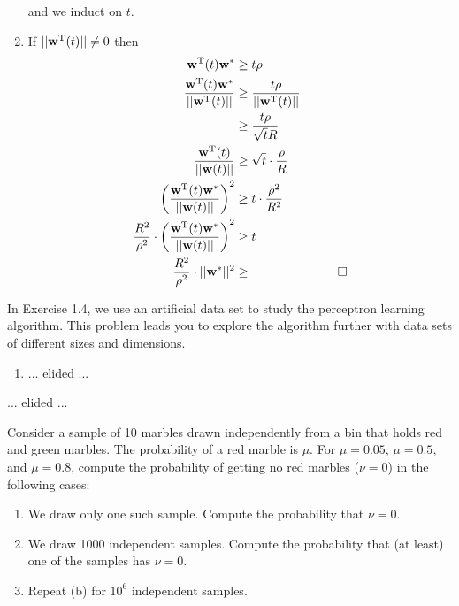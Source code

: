 \documentclass{amsart}
\begin{document}
\begin{solution}
\begin{enumerate}
      and we induct on \(t\).
    \item If \(||{\bf w}^\textup{T}(t)|| \neq 0\) then
      \begin{align*}
        {\bf w}^\textup{T}(t){\bf w}^* &\geq t\rho & & \\
        \frac{{\bf w}^\textup{T}(t){\bf w}^*}{||{\bf w}^\textup{T}(t)||} &\geq
          \frac{t\rho}{||{\bf w}^\textup{T}(t)||} & & \\
        &\geq \frac{t\rho}{\sqrt{t}R} & & \\
        \frac{{\bf w}^\textup{T}(t)}{||{\bf w}(t)||} &\geq
          \sqrt{t} \cdot \frac{\rho}{R} & & \\
        \left(\frac{{\bf w}^\textup{T}(t){\bf w}^*}{||{\bf w}(t)||}\right)^2
          &\geq t \cdot \frac{\rho^2}{R^2} & & \\
        \frac{R^2}{\rho^2} \cdot
          \left(\frac{{\bf w}^\textup{T}(t){\bf w}^*}
          {||{\bf w}(t)||}\right)^2 &\geq t & & \\
        \frac{R^2}{\rho^2} \cdot ||{\bf w}^*||^2 &\geq & &\qed
      \end{align*}
  \end{enumerate}
\end{solution}

\begin{problem}[1.4]
  In Exercise 1.4, we use an artificial data set to study the perceptron
  learning algorithm. This problem leads you to explore the algorithm further
  with data sets of different sizes and dimensions.
  \begin{enumerate}
    \item ... elided ...
  \end{enumerate}
\end{problem}

\begin{problem}[1.5]
  ... elided ...
\end{problem}

\begin{problem}[1.6]
  Consider a sample of 10 marbles drawn independently from a bin that holds red
  and green marbles. The probability of a red marble is \(\mu\). For
  \(\mu = 0.05\), \(\mu = 0.5\), and \(\mu = 0.8\), compute the probability of
  getting no red marbles (\(\nu = 0\)) in the following cases:
  \begin{enumerate}
    \item We draw only one such sample.  Compute the probability that
      \(\nu = 0\).
    \item We draw 1000 independent samples. Compute the probability that (at
      least) one of the samples has \(\nu=0\).
    \item Repeat (b) for \(10^6\) independent samples.
  \end{enumerate}
\end{problem}
\end{document}

